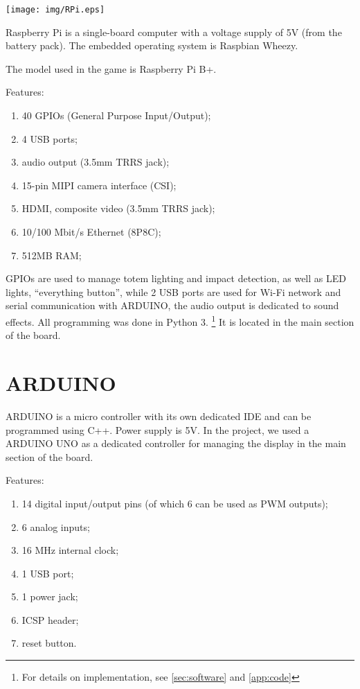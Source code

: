 \documentclass[a4paper,twoside]{book}
\begin{document}
\begin{appendices}
\texttt{[image: img/RPi.eps]}

Raspberry Pi is a single-board computer with a voltage supply of 5V (from the battery pack). The embedded operating system is Raspbian Wheezy. 

The model used in the game is Raspberry Pi B+.

\beforelist Features:
\begin{enumerate}
\item 40 GPIOs (General Purpose Input/Output);
\item 4 USB ports;
\item audio output (3.5mm TRRS jack);
\item 15-pin MIPI camera interface (CSI);
\item HDMI, composite video (3.5mm TRRS jack);
\item 10/100 Mbit/s Ethernet (8P8C);
\item 512MB RAM;
\end{enumerate}
\afterlist*
GPIOs are used to manage totem lighting and impact detection, as well as  LED lights, \textquotedblleft everything button\textquotedblright , while 2 USB ports are used for Wi-Fi network and serial communication with ARDUINO, the audio output is dedicated to sound effects. All programming was done in Python 3.
\footnote {For details on implementation, see \autoref{sec:software} and \autoref{app:code}}
It is located in the main section of the board.

\section{ARDUINO}
\label{app:Arduino}
ARDUINO is a micro controller with its own dedicated IDE and can be programmed using C++. Power supply is 5V. In the project, we used a ARDUINO UNO as a dedicated controller for managing the display in the main section of the board. 

\beforelist Features:
\begin{enumerate}
\item 14 digital input/output pins (of which 6 can be used as PWM outputs);
\item 6 analog inputs;
\item 16 MHz internal clock;
\item 1 USB port;
\item 1 power jack;
\item ICSP header;
\item reset button.
\end{enumerate} 
\afterlist*


\end{appendices}
\end{document}
